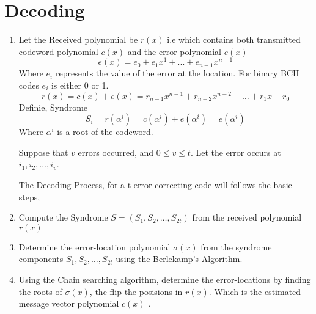 \documentclass[journal,12pt,twocolumn]{IEEEtran}
\renewcommand\thesection{\arabic{section}}
\begin{document}
\section{Decoding}
\begin{enumerate}[label=\thesection.\arabic*
,ref=\thesection.\theenumi]
\item Let the Received polynomial be $r(x)$ i.e which contains both transmitted codeword polynomial $c(x)$ and 
the 
error polynomial $e(x)$ \begin{equation}
e(x)=e_0+e_1x^1+...+e_{n-1}x^{n-1}
\end{equation} Where $e_i$ represents the value of the error at the location. For binary BCH codes  $e_i$ is 
either 0 or 1.
\begin{equation}
r(x)=c(x)+e(x)=r_{n-1}x^{n-1}+r_{n-2}x^{n-2}+\dots+r_1x+r_0
\end{equation}
Definie, Syndrome \begin{equation}
S_i=r(\alpha^i)=c(\alpha^i)+e(\alpha^i)=e(\alpha^i)
\end{equation} Where $\alpha^i $ is a root of the codeword.

Suppose that $v$ errors occurred, and $0\leq v \leq t$.
Let the error occurs at $i_1,i_2,\dots,i_v$. 




The Decoding Process, for a t-error correcting code will follows the basic steps,
\item Compute the Syndrome $S=(S_1,S_2,\dots,S_{2t})$ from the received polynomial $r(x)$
\item Determine the error-location polynomial $\sigma(x)$ from the syndrome components $S_1,S_2,\dots,S_{2t}$ 
using the Berlekamp's Algorithm.
\item Using the Chain searching algorithm, determine the error-locations by finding the roots of $\sigma(x)$, 
the flip the posisions in $r(x)$. Which is the estimated message vector polynomial $\hat{c}(x)$ .


\end{enumerate}
\end{document}
